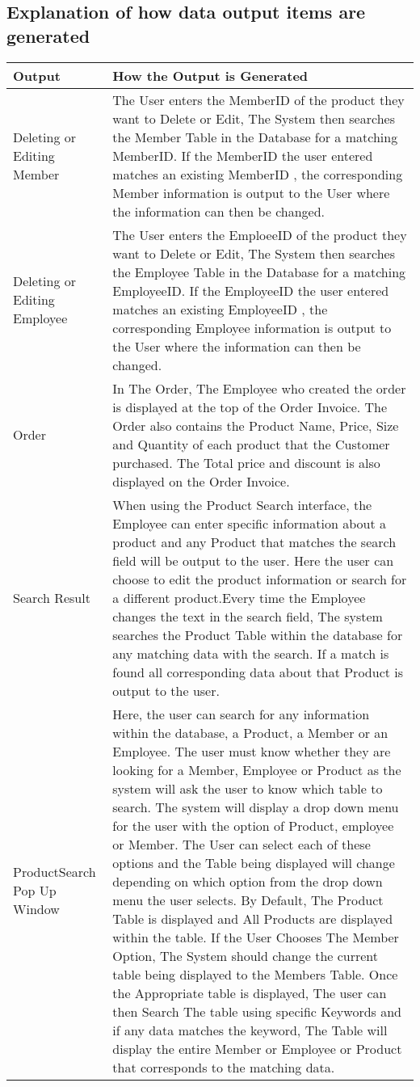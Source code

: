 \subsection{Explanation of how data output items are generated}

  \begin{longtable}{|p{4cm}|p{6cm}|}
        \hline
	\textbf{Output} & \textbf{ How the Output is Generated}\\ \hline
	{ Deleting or Editing Member} & {The User enters the MemberID of the product they want to Delete or Edit, The System then searches the Member Table in the Database for a matching MemberID. If the MemberID the user entered matches an existing MemberID , the corresponding Member information is output to the User where the information can then be changed.}\\ \hline
	{Deleting or Editing Employee} & {The User enters the EmploeeID of the product they want to Delete or Edit, The System then searches the Employee Table in the Database for a matching EmployeeID. If the EmployeeID the user entered matches an existing EmployeeID , the corresponding Employee information is output to the User where the information can then be changed.}\\ \hline
	{Order}&{ In The Order, The Employee who created the order is displayed at the top of the Order Invoice. The Order also contains the Product Name, Price, Size and Quantity of each product that the Customer purchased. The Total price and discount is also displayed on the Order Invoice.}\\ \hline
	{Search Result}&{When using the Product Search interface, the Employee can enter specific information about a product and any Product that matches the search field will be output to the user. Here the user can choose to edit the product information or search for a different product.Every time the Employee changes the text in the search field, The system searches the Product Table within the database for any matching data with the search. If a match is found all corresponding data about that Product is output to the user.}\\ \hline
	{ProductSearch Pop Up Window} & {Here, the user can search for any information within the database, a Product, a Member or an Employee. The user must know whether they are looking for a Member, Employee or Product as the system will ask the user to know which table to search. The system will display a drop down menu for the user with the option of Product, employee or Member. The User can select each of these options and the Table being displayed will change depending on which option from the drop down menu the user selects. By Default, The Product Table is displayed and All Products are displayed within the table. If the User Chooses The Member Option, The System should change the current table being displayed to the Members Table. Once the Appropriate table is displayed, The user can then Search The table using specific Keywords and if any data matches the keyword, The Table will display the entire Member or Employee or Product that corresponds to the matching data.} \\ \hline
	\end{longtable}
	
